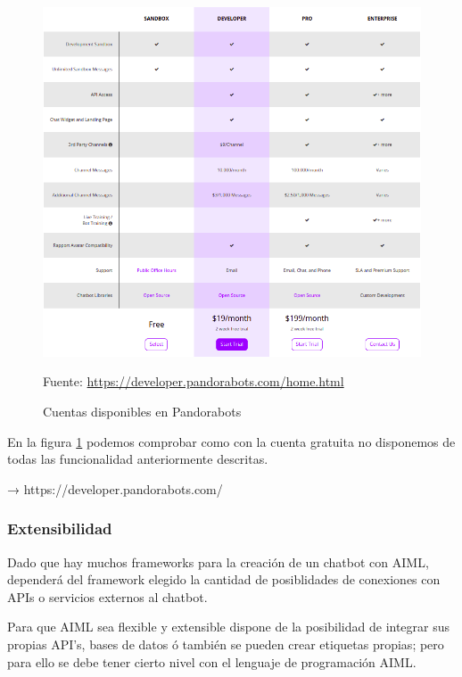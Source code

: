 \begin{figure}[h]
    \centering
    \includegraphics[width=1.0\textwidth]{imagenes/04_Analisis/cuentas_pandorabots.png}
    \begin{center}
        Fuente: \url{https://developer.pandorabots.com/home.html}
    \end{center}
    \caption{Cuentas disponibles en Pandorabots}
    \label{fig:cuenta_pandorabots}
\end{figure}

En la figura \ref{fig:cuenta_pandorabots} podemos comprobar como con la cuenta gratuita no disponemos de todas las funcionalidad anteriormente descritas.


→ https://developer.pandorabots.com/


\subsubsection*{Extensibilidad}

Dado que hay muchos frameworks para la creación de un chatbot con AIML, dependerá del framework elegido la cantidad de posiblidades de conexiones con APIs o servicios externos al chatbot. 

Para que AIML sea flexible y extensible dispone de la posibilidad de integrar sus propias API's, bases de datos ó también se pueden crear etiquetas propias; pero para ello se debe tener cierto nivel con el lenguaje de programación AIML.

